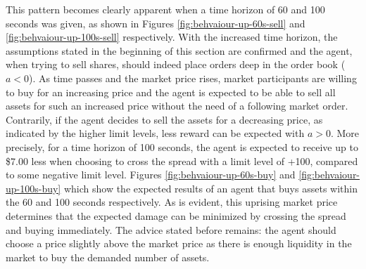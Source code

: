 This pattern becomes clearly apparent when a time horizon of 60 and 100 seconds was given, as shown in Figures \ref{fig:behvaiour-up-60s-sell} and \ref{fig:behvaiour-up-100s-sell} respectively.
With the increased time horizon, the assumptions stated in the beginning of this section are confirmed and the agent, when trying to sell shares, should indeed place orders deep in the order book ($a<0$).
As time passes and the market price rises, market participants are willing to buy for an increasing price and the agent is expected to be able to sell all assets for such an increased price without the need of a following market order.
Contrarily, if the agent decides to sell the assets for a decreasing price, as indicated by the higher limit levels, less reward can be expected with $a>0$.
More precisely, for a time horizon of 100 seconds, the agent is expected to receive up to \$7.00 less when choosing to cross the spread with a limit level of +100, compared to some negative limit level.
Figures \ref{fig:behvaiour-up-60s-buy} and \ref{fig:behvaiour-up-100s-buy} which show the expected results of an agent that buys assets within the 60 and 100 seconds respectively.
As is evident, this uprising market price determines that the expected damage can be minimized by crossing the spread and buying immediately.
The advice stated before remains: the agent should choose a price slightly above the market price as there is enough liquidity in the market to buy the demanded number of assets.

